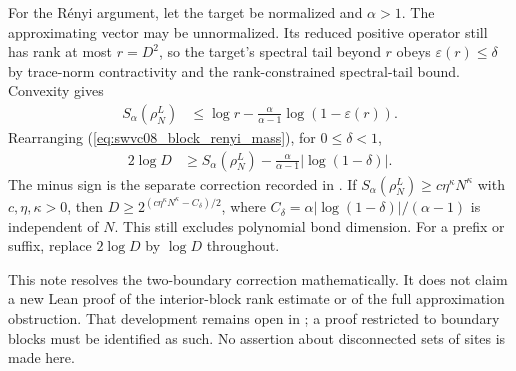 \documentclass{article}
\begin{document}
For the R\'enyi argument, let the target be normalized and $\alpha>1$.
The approximating vector may be unnormalized. Its reduced positive operator
still has rank at most $r=D^2$, so the target's spectral tail beyond $r$
obeys $\varepsilon(r)\le\delta$ by trace-norm contractivity and the
rank-constrained spectral-tail bound. Convexity gives
\begin{align}
    S_\alpha(\rho_N^L) & \le\log r
    -\frac{\alpha}{\alpha-1}\log(1-\varepsilon(r)).
    \label{eq:swvc08_block_renyi_mass}
\end{align}
Rearranging (\ref{eq:swvc08_block_renyi_mass}), for $0\le\delta<1$,
\begin{align}
    2\log D & \ge S_\alpha(\rho_N^L)
    -\frac{\alpha}{\alpha-1}|\log(1-\delta)|.
    \label{eq:swvc08_block_renyi_bound}
\end{align}
The minus sign is the separate correction recorded in
\cite{gap:swvc08_renyi_bond_dimension_sign}. If
$S_\alpha(\rho_N^L)\ge c\eta^\kappa N^\kappa$ with $c,\eta,\kappa>0$,
then $D\ge2^{(c\eta^\kappa N^\kappa-C_\delta)/2}$, where
$C_\delta=\alpha|\log(1-\delta)|/(\alpha-1)$ is independent of $N$.
This still excludes polynomial bond dimension. For a prefix or suffix,
replace $2\log D$ by $\log D$ throughout.

This note resolves the two-boundary correction mathematically. It does not
claim a new Lean proof of the interior-block rank estimate or of the full
approximation obstruction. That development remains open in
; a proof restricted to boundary blocks must be identified as
such. No assertion about disconnected sets of sites is made here.



\end{document}
